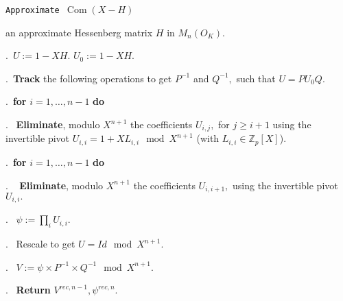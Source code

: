 \documentclass{sig-alternate-05-2015}
\DeclareMathOperator{\com}{Com}
\newcommand{\Z}{\mathbb Z}
\newcommand{\Zp}{\Z_p}
\begin{document}
\noindent\hrulefill

 {\tt Approximate $\com (X -H)$ }

 an approximate Hessenberg matrix $H$ in $M_n(O_K).$

\smallskip

.\ $U:=1-XH.$ $U_0:=1-XH.$

.\ \textbf{Track} the following operations to get $P^{-1}$ and $Q^{-1},$
such that $U=PU_0Q.$


.\ {\bf for} $i=1,\dots,n-1$ {\bf do} 

.\  \:  \textbf{Eliminate}, modulo $X^{n+1}$ the coefficients $U_{i,j},$ for $j\geq i+1$ 
using the invertible pivot
$U_{i,i}=1+XL_{i,i} \mod X^{n+1}$ (with $L_{i,i} \in \Zp [X]$). 

.\    {\bf for} $i=1,\dots,n-1$ {\bf do} 

. \  \:  \textbf{Eliminate}, modulo $X^{n+1}$ the coefficients $U_{i,i+1},$
using the invertible pivot $U_{i,i}.$

. \ $\psi:=\prod_i U_{i,i}.$

. \ Rescale to get $U = Id \mod X^{n+1}.$

. \ $V:=\psi \times P^{-1} \times Q^{-1}   \mod X^{n+1}.$

. \ \textbf{Return} $V^{rec,n-1}, \psi^{rec,n}.$

\vspace{-1ex}\noindent\hrulefill

\medskip
\end{document}
